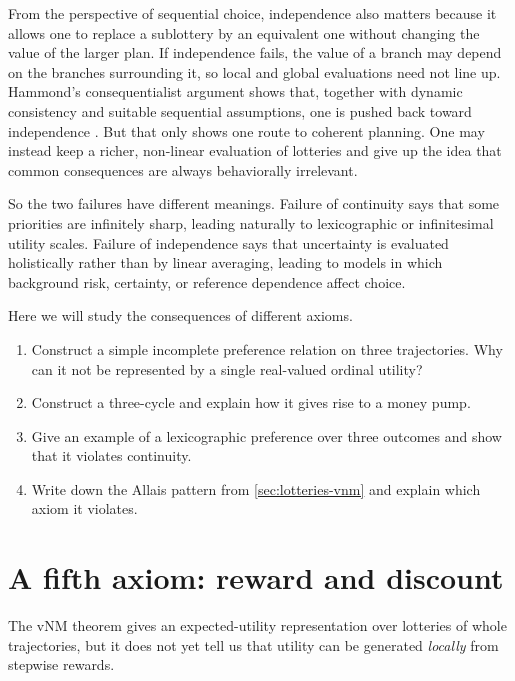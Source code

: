 \documentclass[11pt]{article}
\begin{document}
From the perspective of sequential choice, independence also matters because it allows one to replace a sublottery by an equivalent one without changing the value of the larger plan. If independence fails, the value of a branch may depend on the branches surrounding it, so local and global evaluations need not line up. Hammond's consequentialist argument shows that, together with dynamic consistency and suitable sequential assumptions, one is pushed back toward independence \citep{hammond1988consequentialist}. But that only shows one route to coherent planning. One may instead keep a richer, non-linear evaluation of lotteries and give up the idea that common consequences are always behaviorally irrelevant.

So the two failures have different meanings. Failure of continuity says that some priorities are infinitely sharp, leading naturally to lexicographic or infinitesimal utility scales. Failure of independence says that uncertainty is evaluated holistically rather than by linear averaging, leading to models in which background risk, certainty, or reference dependence affect choice.


\begin{exercise}
\label{ex:vnm-failures}
Here we will study the consequences of different axioms.
\begin{enumerate}[label=(\alph*)]
\item Construct a simple incomplete preference relation on three trajectories.
Why can it not be represented by a single real-valued ordinal utility?
\item Construct a three-cycle and explain how it gives rise to a money pump.
\item Give an example of a lexicographic preference over three outcomes and show
that it violates continuity.
\item Write down the Allais pattern from \cref{sec:lotteries-vnm} and explain which axiom it
violates.
\end{enumerate}
\end{exercise}

\section{A fifth axiom: reward and discount}

The vNM theorem gives an expected-utility representation over lotteries of whole
trajectories, but it does not yet tell us that utility can be generated
\emph{locally} from stepwise rewards. 
\end{document}
